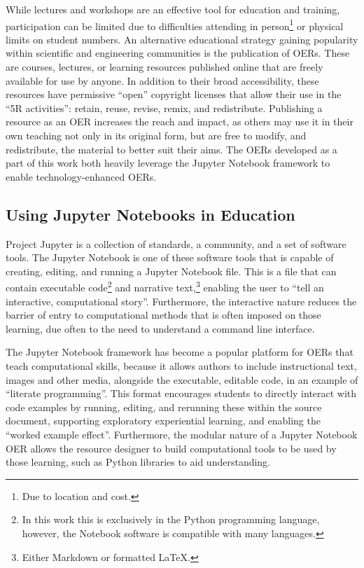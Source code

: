 While lectures and workshops are an effective tool for education and training, participation can be limited due to difficulties attending in person\footnote{Due to location and cost.} or physical limits on student numbers.
An alternative educational strategy gaining popularity within scientific and engineering communities is the publication of OERs.
These are courses, lectures, or learning resources published online that are freely available for use by anyone.
In addition to their broad accessibility, these resources have permissive ``open'' copyright licenses that allow their use in the ``5R activities'': retain, reuse, revise, remix, and redistribute.\autocite{wiley_open_nodate}
Publishing a resource as an OER increases the reach and impact, as others may use it in their own teaching not only in its original form, but are free to modify, and redistribute, the material to better suit their aims.
The OERs developed as a part of this work both heavily leverage the Jupyter Notebook framework\autocite{kluyver_jupyter_2016} to enable technology-enhanced OERs.

\subsection{Using Jupyter Notebooks in Education}
Project Jupyter\autocite{kluyver_jupyter_2016} is a collection of standards, a community, and a set of software tools.
The Jupyter Notebook is one of these software tools that is capable of creating, editing, and running a Jupyter Notebook file.
This is a file that can contain executable code\footnote{In this work this is exclusively in the Python programming language, however, the Notebook software is compatible with many languages.} and narrative text,\footnote{Either Markdown or formatted \LaTeX.} enabling the user to ``tell an interactive, computational story''.\autocite{barba_teaching_2019}
Furthermore, the interactive nature reduces the barrier of entry to computational methods that is often imposed on those learning, due often to the need to understand a command line interface.

The Jupyter Notebook framework has become a popular platform for OERs that teach computational skills, because it allows authors to include instructional text, images and other media, alongside the executable, editable code, in an example of ``literate programming''.\autocite{knuth_literate_1984}
This format encourages students to directly interact with code examples by running, editing, and rerunning these within the source document,\autocite{barba_cybertraining_2017} supporting exploratory experiential learning,\autocite{papert_mindstroms_1993} and enabling the ``worked example effect''.\autocite{tarmizi_guidance_1988}
Furthermore, the modular nature of a Jupyter Notebook OER allows the resource designer to build computational tools to be used by those learning, such as Python libraries to aid understanding.

